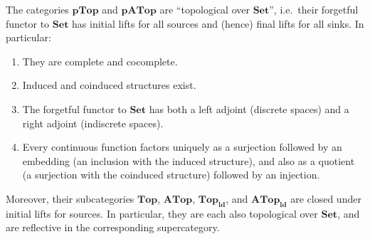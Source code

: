 \documentclass{article}
\def\nn{\ensuremath{\neg\neg}}
\def\Set{\mathbf{Set}}
\def\PTop{\mathbf{pTop}}
\def\Top{\mathbf{Top}}
\def\PTopnn{\mathbf{pTop}_{\nn}}
\def\ldTop{\mathbf{Top}_{\mathbf{ld}}}
\def\APTop{\mathbf{pATop}}
\def\ATop{\mathbf{ATop}}
\def\APTopnn{\mathbf{pATop}_{\nn}}
\def\ldATop{\mathbf{ATop}_{\mathbf{ld}}}
\begin{document}
\begin{thm}\label{thm:top-topconcrete}
  The categories $\PTop$ and $\APTop$ are ``topological over $\Set$'', i.e.\ their forgetful functor to $\Set$ has initial lifts for all sources and (hence) final lifts for all sinks.
  In particular:
  \begin{enumerate}
  \item They are complete and cocomplete.
  \item Induced and coinduced structures exist.
  \item The forgetful functor to $\Set$ has both a left adjoint (discrete spaces) and a right adjoint (indiscrete spaces).
  \item Every continuous function factors uniquely as a surjection followed by an embedding (an inclusion with the induced structure), and also as a quotient (a surjection with the coinduced structure) followed by an injection.
  \end{enumerate}
  Moreover, their subcategories $\Top$, $\ATop$, %
  $\ldTop$, and $\ldATop$ %
  are closed under initial lifts for sources.
  In particular, they are each also topological over $\Set$, and are reflective in the corresponding supercategory.
\end{thm}
\end{document}
